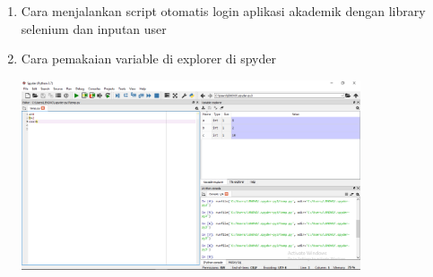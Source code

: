 \begin{enumerate}
\begin{center}
\end{center}
\item Cara menjalankan script otomatis login aplikasi akademik dengan library selenium dan inputan user
\item Cara pemakaian variable di explorer di spyder
\begin{center}
    \includegraphics[width=10cm]{section/Screenshot (5).png}
\end{center}

    
    
\end{enumerate}

